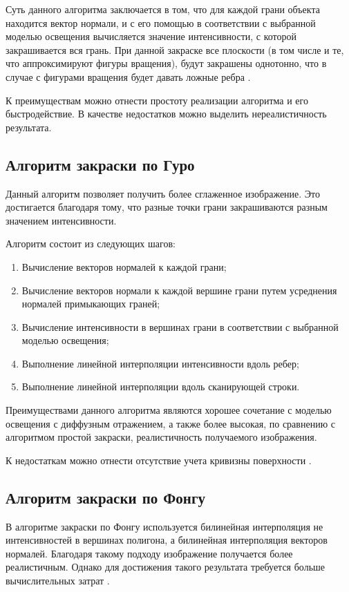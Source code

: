 Суть данного алгоритма заключается в том, что для каждой грани объекта
находится вектор нормали, и с его помощью в соответствии с выбранной
моделью освещения вычисляется значение интенсивности, с которой
закрашивается вся грань.
При данной закраске все плоскости (в том числе и те, что аппроксимируют
фигуры вращения), будут закрашены однотонно, что в случае с фигурами
вращения будет давать ложные ребра \cite{info_rodjers}.

К преимуществам можно отнести простоту реализации алгоритма и его быстродействие. 
В качестве недостатков можно выделить нереалистичность результата.

\subsection{Алгоритм закраски по Гуро}

Данный алгоритм позволяет получить более сглаженное изображение. 
Это достигается благодаря тому, что разные точки грани закрашиваются разным
значением интенсивности.

Алгоритм состоит из следующих шагов:

\begin{enumerate}[label={\arabic*)}]
	\item Вычисление векторов нормалей к каждой грани;
	\item Вычисление векторов нормали к каждой вершине грани путем усреднения нормалей примыкающих граней;
	\item Вычисление интенсивности в вершинах грани в соответствии с выбранной моделью освещения;
	\item Выполнение линейной интерполяции интенсивности вдоль ребер;
	\item Выполнение линейной интерполяции вдоль сканирующей строки.
\end{enumerate}

Преимуществами данного алгоритма являются хорошее сочетание с моделью освещения с диффузным отражением, а также более высокая, по сравнению с алгоритмом простой закраски, реалистичность получаемого изображения.

К недостаткам можно отнести отсутствие учета кривизны поверхности \cite{info_rodjers}.

\subsection{Алгоритм закраски по Фонгу}

В алгоритме закраски по Фонгу используется билинейная интерполяция не интенсивностей в вершинах полигона, а билинейная интерполяция векторов нормалей. 
Благодаря такому подходу изображение получается более реалистичным. 
Однако для достижения такого результата требуется больше вычислительных затрат \cite{info_rodjers}.

